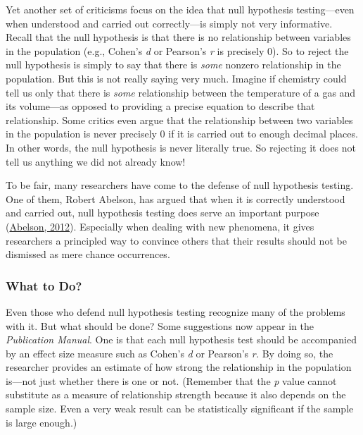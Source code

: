 \documentclass[
]{krantz}
\begin{document}
Yet another set of criticisms focus on the idea that null hypothesis testing---even when understood and carried out correctly---is simply not very informative. Recall that the null hypothesis is that there is no relationship between variables in the population (e.g., Cohen's \emph{d} or Pearson's \emph{r} is precisely 0). So to reject the null hypothesis is simply to say that there is \emph{some} nonzero relationship in the population. But this is not really saying very much. Imagine if chemistry could tell us only that there is \emph{some} relationship between the temperature of a gas and its volume---as opposed to providing a precise equation to describe that relationship. Some critics even argue that the relationship between two variables in the population is never precisely 0 if it is carried out to enough decimal places. In other words, the null hypothesis is never literally true. So rejecting it does not tell us anything we did not already know!

To be fair, many researchers have come to the defense of null hypothesis testing. One of them, Robert Abelson, has argued that when it is correctly understood and carried out, null hypothesis testing does serve an important purpose (\protect\hyperlink{ref-abelson2012statistics}{Abelson, 2012}). Especially when dealing with new phenomena, it gives researchers a principled way to convince others that their results should not be dismissed as mere chance occurrences.

\hypertarget{what-to-do}{%
\subsubsection*{What to Do?}\label{what-to-do}}


Even those who defend null hypothesis testing recognize many of the problems with it. But what should be done? Some suggestions now appear in the \emph{Publication Manual}. One is that each null hypothesis test should be accompanied by an effect size measure such as Cohen's \emph{d} or Pearson's \emph{r.} By doing so, the researcher provides an estimate of how strong the relationship in the population is---not just whether there is one or not. (Remember that the \emph{p} value cannot substitute as a measure of relationship strength because it also depends on the sample size. Even a very weak result can be statistically significant if the sample is large enough.)
\end{document}
